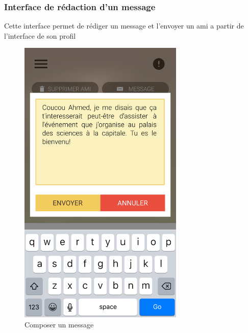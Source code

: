\documentclass[11pt,a4paper,oneside]{book}
\begin{document}
					\subsubsection{Interface de rédaction d’un message}
					Cette interface permet de rédiger un message et l’envoyer un ami a partir de l’interface de son profil
					\begin{figure}[H]
						\centering
						\includegraphics[width=0.7\textwidth]{../Maquettes/Hanimo-maquettes/Output/05-View-User-Profile-Compose-Message}
						\caption{Composer un message}
						\label{fig:05-view-user-profile-compose-message}
					\end{figure}
				\vfill
				
\end{document}
